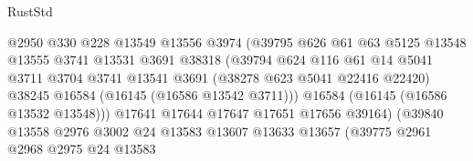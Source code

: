 \begin{lexlean}{RustStd}
\begin{coremodule}
                                      @2950
                                      @330
                                      @228
                                      @13549
                                      @13556
                                      @3974
                                      (@39795
                                        @626
                                        @61
                                        @63
                                        @5125
                                        @13548
                                        @13555
                                        @3741
                                        @13531
                                        @3691
                                        @38318
                                        (@39794
                                          @624
                                          @116
                                          @61
                                          @14
                                          @5041
                                          @3711
                                          @3704
                                          @3741
                                          @13541
                                          @3691
                                          (@38278 @623 @5041 @22416 @22420)
                                          @38245
                                          @16584
                                          (@16145 (@16586 @13542 @3711)))
                                        @16584
                                        (@16145 (@16586 @13532 @13548)))
                                      @17641
                                      @17644
                                      @17647
                                      @17651
                                      @17656
                                      @39164)
                                    (@39840
                                      @13558
                                      @2976
                                      @3002
                                      @24
                                      @13583
                                      @13607
                                      @13633
                                      @13657
                                      (@39775
                                        @2961
                                        @2968
                                        @2975
                                        @24
                                        @13583

\end{coremodule}
\end{lexlean}
